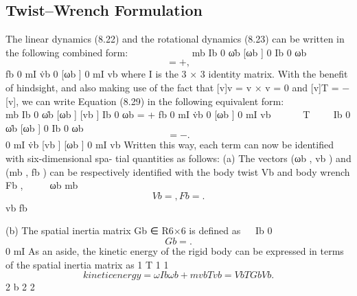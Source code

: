 \documentclass[12pt,a4paper]{article}
\begin{document}
\subsection{Twist–Wrench Formulation}
The linear dynamics (8.22) and the rotational dynamics (8.23) can be written
in the following combined form:
                                                       
     mb         Ib 0        ω̇b     [ωb ]  0       Ib 0        ωb
\begin{equation}
=                    +                                  ,
\label{eq:8.29}
\end{equation}
      fb         0 mI       v̇b       0   [ωb ]    0 mI        vb
where I is the 3 × 3 identity matrix. With the benefit of hindsight, and also
making use of the fact that [v]v = v × v = 0 and [v]T = −[v], we can write
Equation (8.29) in the following equivalent form:
                                                       
   mb         Ib 0          ω̇b      [ωb ] [vb ]     Ib 0      ωb
          =                      +
    fb         0 mI         v̇b       0    [ωb ]      0 mI     vb
                                            T              
              Ib 0          ω̇b      [ωb ]   0         Ib 0     ωb
\begin{equation}
=                      −                                    .
\label{eq:8.30}
\end{equation}
               0 mI         v̇b      [vb ] [ωb ]       0 mI     vb
    Written this way, each term can now be identified with six-dimensional spa-
tial quantities as follows:
  (a) The vectors (ωb , vb ) and (mb , fb ) can be respectively identified with the
      body twist Vb and body wrench Fb ,
                                                         
                                   ωb                   mb
\begin{equation}
Vb =           ,    Fb =          .
\label{eq:8.31}
\end{equation}
                                   vb                   fb

  (b) The spatial inertia matrix Gb ∈ R6×6 is defined as
                                             
                                      Ib 0
\begin{equation}
Gb =              .
\label{eq:8.32}
\end{equation}
                                      0 mI
       As an aside, the kinetic energy of the rigid body can be expressed in terms
       of the spatial inertia matrix as
                                          1 T       1         1
\begin{equation}
kinetic energy =        ω Ib ωb + mvbT vb = VbT Gb Vb .
\label{eq:8.33}
\end{equation}
                                          2 b       2         2
\end{document}
